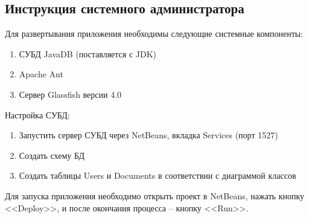 \subsection{Инструкция системного администратора}
Для развертывания приложения необходимы следующие  системные компоненты:
\begin{enumerate}
	\item СУБД JavaDB (поставляется с JDK)
	\item Apache Ant
	\item Сервер Glassfish версии 4.0
\end{enumerate}
Настройка СУБД:
\begin{enumerate}
	\item Запустить сервер СУБД через NetBeans, вкладка Services (порт 1527)
	\item Создать схему БД
	\item Создать таблицы Users и Documents в соответствии с диаграммой классов
\end{enumerate}
Для запуска приложения необходимо открыть проект в NetBeans, нажать кнопку <<Deploy>>, и после окончания процесса -- кнопку <<Run>>.